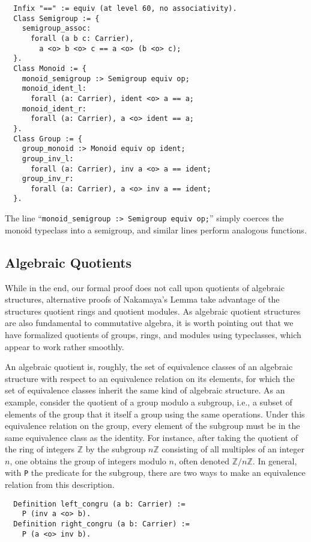 \documentclass[referee,sn-mathphys]{sn-jnl}
\theoremstyle{definition}
\theoremstyle{remark}
\numberwithin{equation}{section}
\numberwithin{figure}{subsection}
\begin{document}
\begin{verbatim}
  Infix "==" := equiv (at level 60, no associativity).
  Class Semigroup := {
    semigroup_assoc:
      forall (a b c: Carrier),
        a <o> b <o> c == a <o> (b <o> c);
  }.
  Class Monoid := {
    monoid_semigroup :> Semigroup equiv op;
    monoid_ident_l:
      forall (a: Carrier), ident <o> a == a;
    monoid_ident_r:
      forall (a: Carrier), a <o> ident == a;
  }.
  Class Group := {
    group_monoid :> Monoid equiv op ident;
    group_inv_l:
      forall (a: Carrier), inv a <o> a == ident;
    group_inv_r:
      forall (a: Carrier), a <o> inv a == ident;
  }.
\end{verbatim}
The line  ``\verb|monoid_semigroup :> Semigroup equiv op;|'' simply coerces
the monoid typeclass into a semigroup, and similar lines perform analogous functions.


\subsection{Algebraic Quotients}
While in the end, our formal proof does not call upon quotients of
algebraic structures, alternative proofs of Nakamaya's Lemma take advantage of 
 the structures quotient rings and quotient modules.  As algebraic 
 quotient structures are also fundamental to commutative algebra,
it is worth pointing out that we have formalized quotients of groups, rings, and modules 
  using typeclasses, which appear to work rather smoothly. 

An algebraic quotient is, roughly, the set of equivalence classes of an
algebraic structure with respect to an equivalence relation on its elements,
for which the set of equivalence classes inherit the same kind of algebraic
structure. 
As an example, consider the quotient of a group modulo a subgroup,
i.e., a subset of elements of the group that it itself a group using the same operations. 
Under this equivalence relation on the group, every element of the
subgroup must be in the same equivalence class as the identity. 
For instance, after taking the quotient of the ring of integers $\mathbb{Z}$ by the
subgroup $n \mathbb{Z}$ consisting of all multiples of an integer $n$, one obtains the
group of integers modulo $n$, often denoted $\mathbb{Z}/n\mathbb{Z}$.
In general, with \texttt{P}
the predicate for the subgroup, there are two ways to make an equivalence
relation from this description.

\begin{verbatim}
  Definition left_congru (a b: Carrier) :=
    P (inv a <o> b).
  Definition right_congru (a b: Carrier) :=
    P (a <o> inv b).
\end{verbatim}
\end{document}
